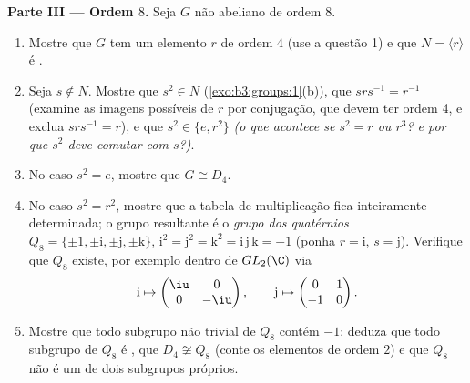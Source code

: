 \begin{problem}
\medskip
\noindent\textbf{Parte III --- Ordem $8$.} Seja $G$ não
abeliano de ordem $8$.
\begin{enumerate}[resume]
  \item Mostre que $G$ tem um elemento $r$ de ordem $4$
        (use a questão 1) e que $N = \langle r\rangle$ é .
  \item Seja $s \notin N$. Mostre que $s^2 \in N$ (\cref{exo:b3:groups:1}(b)), que $srs^{-1} = r^{-1}$
        (examine as imagens possíveis de $r$ por conjugação, que
        devem ter ordem 4, e exclua $srs^{-1} = r$), e que $s^2 \in \{e, r^2\}$ \emph{(o que
        acontece se $s^2 = r$ ou $r^3$? e por que $s^2$ deve
        comutar com $s$?)}.
  \item No caso $s^2 = e$, mostre que $G \cong D_4$.
  \item No caso $s^2 = r^2$, mostre que a tabela de multiplicação fica
        inteiramente determinada; o grupo resultante é o \emph{grupo
        dos quatérnios} $Q_8 =
        \{\pm 1, \pm \mathrm i, \pm \mathrm j, \pm \mathrm k\}$, $\mathrm i^2 = \mathrm j^2 = \mathrm k^2 = \mathrm i\,
        \mathrm j\,\mathrm k = -1$
        (ponha $r = \mathrm i$, $s =
        \mathrm j$). Verifique que $Q_8$ existe, por
        exemplo dentro de $GL_2(\C)$ via
        \[
        \mathrm i \mapsto \begin{pmatrix} \iu & 0\\ 0 & -\iu
        \end{pmatrix},
        \qquad
        \mathrm j \mapsto \begin{pmatrix} 0 & 1\\ -1 & 0
        \end{pmatrix}.
        \]
  \item Mostre que todo subgrupo não trivial de $Q_8$ contém
        $-1$; deduza que todo subgrupo de $Q_8$ é , que
        $D_4 \not\cong Q_8$ (conte os elementos de ordem $2$) e que $Q_8$
        não é um  de dois subgrupos próprios.
\end{enumerate}


\end{problem}
